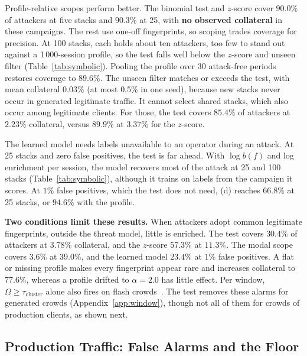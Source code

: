 \documentclass[conference,letterpaper,10pt]{IEEEtran}
\newcommand\1{\textit{(i)}}
\newcommand\2{\textit{(ii)}}
\newcommand\3{\textit{(iii)}}
\newcommand\4{\textit{(iv)}}
\newcommand\5{\textit{(v)}}
\newcommand\6{\textit{(vi)}}
\newcommand\7{\textit{(vii)}}
\newcommand\8{\textit{(viii)}}
\newcommand\9{\textit{(ix)}}
\begin{document}
Profile-relative scopes perform better. The binomial test
and $z$-score cover $90.0\%$ of attackers at five stacks
and $90.3\%$ at 25, with \textbf{no observed collateral}
in these campaigns. The rest use one-off fingerprints, so
scoping trades coverage for precision. At 100 stacks, each
holds about ten attackers, too few to stand out against a
1\,000-session profile, so the test falls well below the
$z$-score and unseen filter (Table~\ref{tab:symbolic}).
Pooling the
profile over 30 attack-free periods restores coverage
to $89.6\%$. The unseen filter matches or exceeds the test,
with mean collateral $0.03\%$ (at most $0.5\%$ in one seed),
because new stacks never occur in generated legitimate
traffic.
It cannot select shared stacks, which also occur
among legitimate clients. For those, the test covers
$85.4\%$ of attackers at $2.23\%$ collateral,
versus $89.9\%$ at $3.37\%$ for the $z$-score.

The learned model needs labels unavailable to an operator
during an attack. At 25 stacks and zero false positives, the
test is far ahead. With $\log b(f)$ and log
enrichment per session, the model recovers most of the
attack at 25 and 100 stacks (Table~\ref{tab:symbolic}),
although it trains on labels from the campaign it scores.
At $1\%$ false positives, which the test does not need, (d)
reaches $66.8\%$ at 25 stacks, or $94.6\%$ with the profile.

\textbf{Two conditions limit these results.}
When attackers adopt common legitimate fingerprints,
outside the threat model, little is enriched. The test
covers $30.4\%$ of attackers
at $3.78\%$ collateral, and the $z$-score $57.3\%$ at
$11.3\%$. The modal scope covers $3.6\%$ at $39.0\%$, and
the learned model $23.4\%$ at $1\%$ false positives. A flat
or missing profile makes every fingerprint appear rare and
increases
collateral to $77.6\%$, whereas a profile drifted
to $\alpha = 2.0$ has little effect. Per window, $\Omega
\geq \tau_{\mathrm{cluster}}$ alone also fires on flash
crowds~\cite{jung2002flash}. The test removes these alarms
for generated crowds (Appendix~\ref{app:window}), though not
all of them for crowds of production clients, as shown next.

\subsection{Production Traffic: False Alarms and the Floor}
\label{sec:production}
\end{document}
